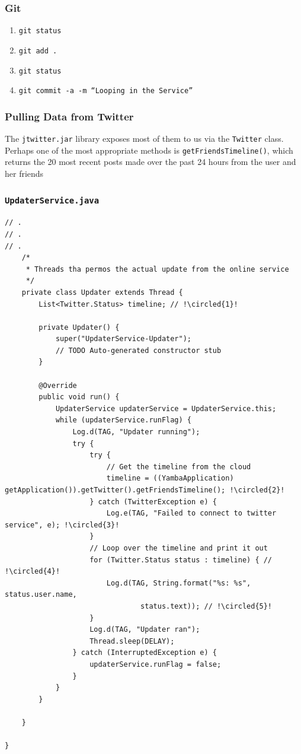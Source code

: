 \begin{frame}[fragile]
\frametitle{Git}
\begin{enumerate}
\item \texttt{git status}
\item \texttt{git add .}
\item \texttt{git status}
\item \texttt{git commit -a -m ``Looping in the Service''}
\end{enumerate}

\end{frame}
\begin{frame}[fragile]
\frametitle{Pulling Data from Twitter}
The \texttt{jtwitter.jar} library exposes most of them to us via the \texttt{Twitter} class. Perhaps one
of the most appropriate methods is \texttt{getFriendsTimeline()}, which returns the 20 most
recent posts made over the past 24 hours from the user and her friends
\end{frame}
\begin{frame}
\frametitle{\texttt{UpdaterService.java}}
\lstset{language=java, style=eclipse, breaklines=true, tabsize=2}
\begin{lstlisting}[caption=src/com/artemisa/yamba/UpdaterService.java, basicstyle=\tiny,escapechar=!]
// .
// .
// .
	/*
	 * Threads tha permos the actual update from the online service
	 */
	private class Updater extends Thread {
		List<Twitter.Status> timeline; // !\circled{1}!

		private Updater() {
			super("UpdaterService-Updater");
			// TODO Auto-generated constructor stub
		}

		@Override
		public void run() {
			UpdaterService updaterService = UpdaterService.this;
			while (updaterService.runFlag) {
				Log.d(TAG, "Updater running");
				try {
					try {
						// Get the timeline from the cloud
						timeline = ((YambaApplication) getApplication()).getTwitter().getFriendsTimeline(); !\circled{2}!
					} catch (TwitterException e) {
						Log.e(TAG, "Failed to connect to twitter service", e); !\circled{3}!
					}
					// Loop over the timeline and print it out
					for (Twitter.Status status : timeline) { // !\circled{4}!
						Log.d(TAG, String.format("%s: %s", status.user.name,
								status.text)); // !\circled{5}!
					}
					Log.d(TAG, "Updater ran");
					Thread.sleep(DELAY);
				} catch (InterruptedException e) {
					updaterService.runFlag = false;
				}
			}
		}

	}

}

\end{lstlisting}
\end{frame}

